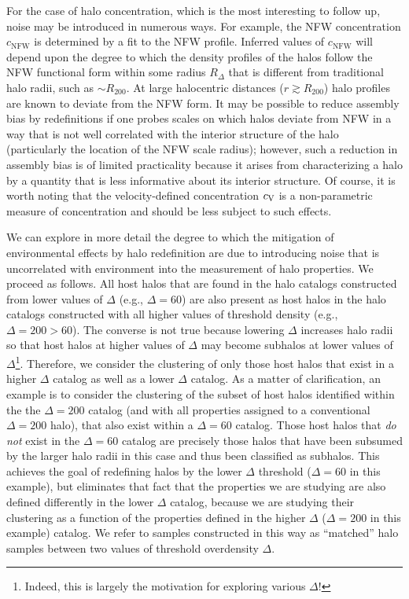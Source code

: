 \documentclass[usenatbib,fleqn]{mnras}
\begin{document}
For the case of halo concentration, which is the most interesting to 
follow up, noise may be introduced in numerous ways. For example, 
the NFW concentration $c_{\mathrm{NFW}}$ is determined by a fit to the 
NFW profile. Inferred values of $c_{\mathrm{NFW}}$ will depend upon 
the degree to which the density profiles of the halos follow the NFW 
functional form within some radius $R_{\Delta}$ that is different from 
traditional halo radii, such as $\sim R_{200}$. At large halocentric 
distances ($r \gtrsim R_{200}$) halo profiles are known to deviate 
from the NFW form. It may be possible to reduce assembly bias by redefinitions if one probes scales on which halos deviate from NFW in a way that is not well correlated with the interior structure of the halo (particularly the location of the NFW scale radius); however, such a reduction in assembly bias is of limited practicality because it arises from characterizing a halo by a quantity that is less informative about its interior structure. Of course, it is worth noting that the velocity-defined concentration $c_{\rm V}$ is a non-parametric measure of concentration and should be less subject to such effects. 

We can explore in more detail the degree to which the mitigation of environmental effects by halo redefinition are due to introducing noise 
that is uncorrelated with environment into the measurement of halo properties. We proceed as follows. All host halos that are found in the halo catalogs constructed from lower values of $\Delta$ (e.g., $\Delta=60$) are also present as host halos in the halo catalogs constructed with all higher values of threshold density (e.g., $\Delta=200>60$). The converse is not true because lowering $\Delta$ increases halo radii so that host halos at higher values of $\Delta$ may become subhalos at lower values of $\Delta$\footnote{Indeed, this is largely the motivation for exploring various $\Delta$!}. Therefore, we consider the clustering of only those host halos that exist in a higher $\Delta$ catalog as well as a lower $\Delta$ catalog. As a matter of clarification, an example is to consider the clustering of the subset of host halos identified within the the $\Delta=200$ catalog (and with all properties assigned to a conventional $\Delta=200$ halo), that also exist within a $\Delta=60$ catalog. Those host halos that {\em do not} exist in the $\Delta=60$ catalog are precisely those halos that have been subsumed by the larger halo radii in this case and thus been classified as subhalos. This achieves the goal of redefining halos by the lower $\Delta$ threshold ($\Delta=60$ in this example), but eliminates that fact that the properties we are studying are also defined differently in the lower $\Delta$ catalog, because we are studying their clustering as a function of the properties defined in the higher $\Delta$ ($\Delta=200$ in this example) catalog. We refer to samples constructed in this way as ``matched'' halo samples between two values of threshold overdensity $\Delta$. 
\end{document}
